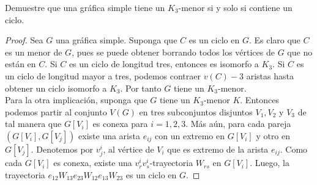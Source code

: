 \documentclass[12pt]{article}
\newenvironment{problem}[2][Problema]{\begin{trivlist}
\item[\hskip \labelsep {\bfseries #1}\hskip \labelsep {\bfseries #2.}]}{\end{trivlist}}
\begin{document}
\begin{problem}{10.5.1}
Demuestre que una gráfica simple tiene un $K_3$-menor si y solo si contiene un ciclo. 
\end{problem}
\begin{proof}
Sea $G$ una gráfica simple. Suponga que $C$ es un ciclo en $G.$ Es claro que $C$ es un menor de $G$, pues se puede obtener borrando todos los vértices de $G$ que no están en $C.$ Si $C$ es un ciclo de longitud tres, entonces es isomorfo a $K_3.$ Si $C$ es un ciclo de longitud mayor a tres, podemos contraer $v(C) - 3$ aristas hasta obtener un ciclo isomorfo a $K_3.$ Por tanto $G$ tiene un $K_3$-menor.\\
Para la otra implicación, suponga que $G$ tiene un $K_3$-menor $K.$ Entonces podemos partir al conjunto $V(G)$ en tres subconjuntos disjuntos $V_1, V_2$ y $V_3$ de tal manera que $G[V_i]$ es conexa para $i=1,2,3$. Más aún, para cada pareja $(G[V_i], G[V_j])$ existe una arista $e_{ij}$ con un extremo en $G[V_i]$ y otro en $G[V_j]$. Denotemos por $v^i_j$, al vértice de $V_i$ que es extremo de la arista $e_{ij}$. Como cada $G[V_i]$ es conexa, existe una $v^i_r v^i_s$-trayectoria $W_{rs}$ en $G[V_i].$ Luego, la trayectoria $e_{12} W_{13} e_{23} W_{12} e_{13} W_{23}$ es un ciclo en $G.$
\end{proof}
\end{document}
